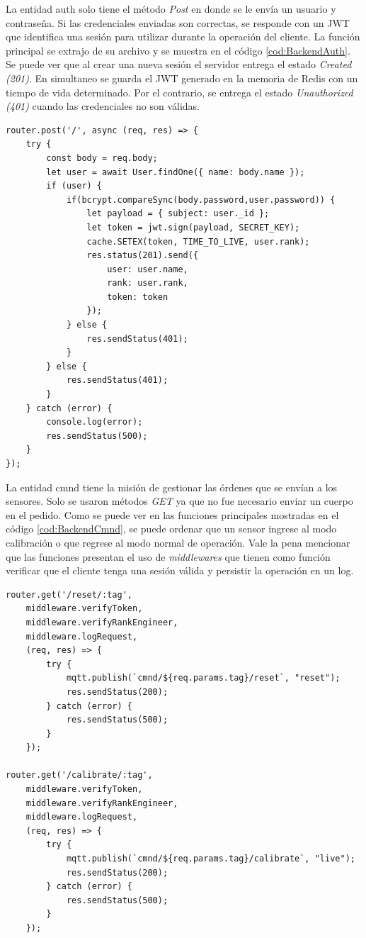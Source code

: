 La entidad auth solo tiene el método \emph{Post} en donde se le envía un usuario y contraseña.
Si las credenciales enviadas son correctas, se responde con un JWT que identifica una sesión para utilizar durante la operación del cliente.
La función principal se extrajo de su archivo y se muestra en el código \ref{cod:BackendAuth}.
Se puede ver que al crear una nueva sesión el servidor entrega el estado \emph{Created (201)}.
En simultaneo se guarda el JWT generado en la memoria de Redis con un tiempo de vida determinado.
Por el contrario, se entrega el estado \emph{Unauthorized (401)} cuando las credenciales no son válidas.

\newpage

\begin{lstlisting}[label=cod:BackendAuth,caption=Función principal de la entidad auth]
router.post('/', async (req, res) => {
    try {
        const body = req.body;
        let user = await User.findOne({ name: body.name });
        if (user) {
            if(bcrypt.compareSync(body.password,user.password)) {
                let payload = { subject: user._id };
                let token = jwt.sign(payload, SECRET_KEY);
                cache.SETEX(token, TIME_TO_LIVE, user.rank);
                res.status(201).send({
                    user: user.name,
                    rank: user.rank,
                    token: token
                });
            } else {
                res.sendStatus(401);
            }
        } else {
            res.sendStatus(401);
        }
    } catch (error) {
        console.log(error);
        res.sendStatus(500);
    }
});
\end{lstlisting}

La entidad cmnd tiene la misión de gestionar las órdenes que se envían a los sensores.
Solo se usaron métodos \emph{GET} ya que no fue necesario enviar un cuerpo en el pedido.
Como se puede ver en las funciones principales mostradas en el código \ref{cod:BackendCmnd}, se puede ordenar que un sensor ingrese al modo calibración o que regrese al modo normal de operación.
Vale la pena mencionar que las funciones presentan el uso de \emph{middlewares} que tienen como función verificar que el cliente tenga una sesión válida y persistir la operación en un log.

\begin{lstlisting}[label=cod:BackendCmnd,caption=Funciones principales de la entidad cmnd]
router.get('/reset/:tag',
    middleware.verifyToken,
    middleware.verifyRankEngineer,
    middleware.logRequest,
    (req, res) => {
        try {
            mqtt.publish(`cmnd/${req.params.tag}/reset`, "reset");
            res.sendStatus(200);
        } catch (error) {
            res.sendStatus(500);
        }
    });

router.get('/calibrate/:tag',
    middleware.verifyToken,
    middleware.verifyRankEngineer,
    middleware.logRequest,
    (req, res) => {
        try {
            mqtt.publish(`cmnd/${req.params.tag}/calibrate`, "live");
            res.sendStatus(200);
        } catch (error) {
            res.sendStatus(500);
        }
    });
\end{lstlisting}

